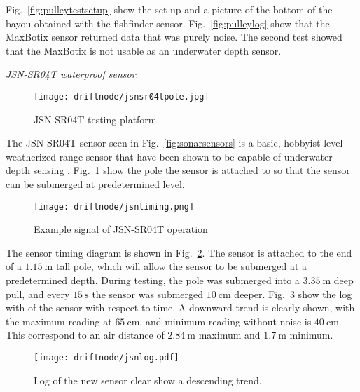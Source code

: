 Fig.~\ref{fig:pulleytestsetup} show the set up and a picture of the bottom of the bayou obtained with the fishfinder sensor.
Fig.~\ref{fig:pulleylog} show that the MaxBotix sensor returned data that was purely noise.
The second test showed that the MaxBotix is not usable as an underwater depth sensor.

\noindent  \emph{JSN-SR04T waterproof sensor}:

\begin{figure}[h]
	\begin{center}
	\texttt{[image: driftnode/jsnsr04tpole.jpg]}
	\caption[JSN-SR04T]{
		JSN-SR04T testing platform
	} \label{fig:jsnsr04t}
	\end{center}
	\vspace{-1em}
\end{figure}
The JSN-SR04T sensor seen in Fig.~\ref{fig:sonarsensors} is a basic, hobbyist level weatherized range sensor that have been shown to be capable of underwater depth sensing \cite{bakarsonar}. Fig.~\ref{fig:jsnsr04t} show the pole the sensor is attached to so that the sensor can be submerged at predetermined level.
\begin{figure}[h]
	\begin{center}
	\texttt{[image: driftnode/jsntiming.png]}
	\caption[JSN-SR04T Timing]{
		Example signal of JSN-SR04T operation
	} \label{fig:jsntiming}
	\end{center}
	\vspace{-1em}
\end{figure}
The sensor timing diagram is shown in Fig.~\ref{fig:jsntiming}.
The sensor is attached to the end of a $\SI{1.15}{\metre}$ tall pole, which will allow the sensor to be submerged at a predetermined depth.
During testing, the pole was submerged into a $\SI{3.35}{\metre}$ deep pull, and every $\SI{15}{\second}$ the sensor was submerged $\SI{10}{\centi\metre}$ deeper.
Fig.~\ref{fig:jsnlog} show the log with of the sensor with respect to time.
A downward trend is clearly shown, with the maximum reading at $\SI{65}{\centi\metre}$, and minimum reading without noise is $\SI{40}{\centi\metre}$.
This correspond to an air distance of $\SI{2.84}{\metre}$ maximum and $\SI{1.7}{\metre}$ minimum.

\begin{figure}[h]
	\begin{center}
	\texttt{[image: driftnode/jsnlog.pdf]}
	\caption[JSN-SR04T sensor log]{
		Log of the new sensor clear show a descending trend.
	} \label{fig:jsnlog}
	\end{center}
	\vspace{-1em}
\end{figure}
